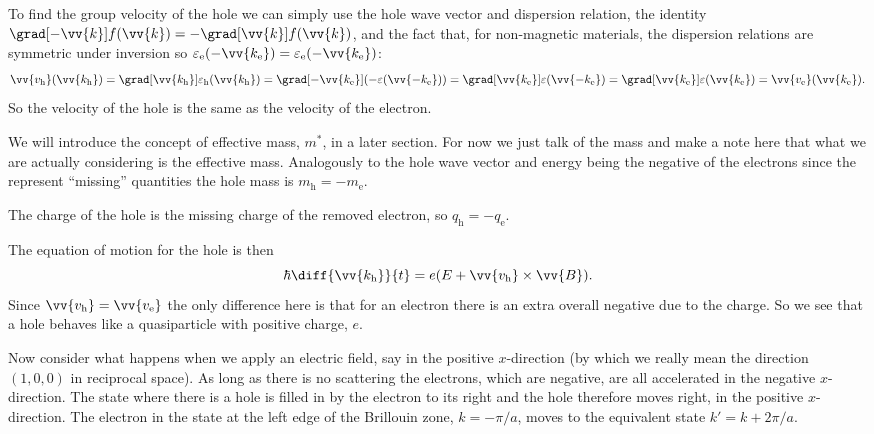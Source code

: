 \documentclass[fleqn]{NotesClass}
\begin{document}
    To find the group velocity of the hole we can simply use the hole wave vector and dispersion relation, the identity \(\grad[-\vv{k}] f(\vv{k}) = -\grad[\vv{k}]f(\vv{k})\), and the fact that, for non-magnetic materials, the dispersion relations are symmetric under inversion so \(\varepsilon_{\mathrm{e}}(-\vv{k_{\mathrm{e}}}) = \varepsilon_{\mathrm{e}}(-\vv{k_{\mathrm{e}}})\):
    \begin{equation}
        \vv{v_{\mathrm{h}}}(\vv{k_{\mathrm{h}}}) = \grad[\vv{k_{\mathrm{h}}}] \varepsilon_{\mathrm{h}}(\vv{k_{\mathrm{h}}}) = \grad[-\vv{k_{\mathrm{e}}}](-\varepsilon(\vv{-k_{\mathrm{e}}})) = \grad[\vv{k_{\mathrm{e}}}]\varepsilon(\vv{-k_{\mathrm{e}}}) = \grad[\vv{k_{\mathrm{e}}}]\varepsilon(\vv{k_{\mathrm{e}}}) = \vv{v_{\mathrm{e}}}(\vv{k_{\mathrm{e}}}).
    \end{equation}
    So the velocity of the hole is the same as the velocity of the electron.
    
    We will introduce the concept of effective mass, \(m^*\), in a later section. %
    For now we just talk of the mass and make a note here that what we are actually considering is the effective mass.
    Analogously to the hole wave vector and energy being the negative of the electrons since the represent \enquote{missing} quantities the hole mass is \(m_{\mathrm{h}} = -m_{\mathrm{e}}\).
    
    The charge of the hole is the missing charge of the removed electron, so \(q_{\mathrm{h}} = -q_{\mathrm{e}}\).
    
    The equation of motion for the hole is then
    \begin{equation}
        \hbar \diff{\vv{k_{\mathrm{h}}}}{t} = e(E + \vv{v_{\mathrm{h}}} \times \vv{B}).
    \end{equation}
    Since \(\vv{v_{\mathrm{h}}} = \vv{v_{\mathrm{e}}}\) the only difference here is that for an electron there is an extra overall negative due to the charge.
    So we see that a hole behaves like a quasiparticle with positive charge, \(e\).
    
    Now consider what happens when we apply an electric field, say in the positive \(x\)-direction (by which we really mean the direction \((1, 0, 0)\) in reciprocal space).
    As long as there is no scattering the electrons, which are negative, are all accelerated in the negative \(x\)-direction.
    The state where there is a hole is filled in by the electron to its right and the hole therefore moves right, in the positive \(x\)-direction.
    The electron in the state at the left edge of the Brillouin zone, \(k = -\pi/a\), moves to the equivalent state \(k' = k + 2\pi/a\).
    
\end{document}

